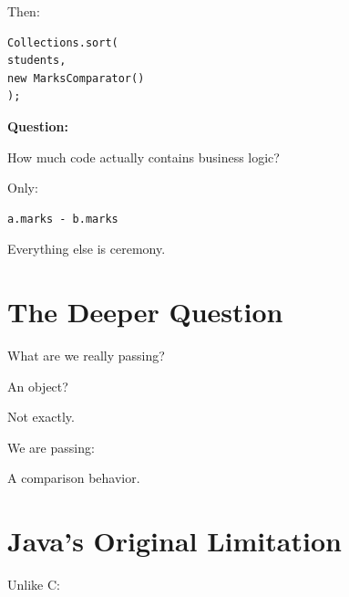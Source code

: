 \documentclass[11pt,a4paper]{book}
\begin{document}

Then:

\begin{verbatim} 
Collections.sort(
students,
new MarksComparator()
);
\end{verbatim}


\textbf{Question:}


How much code actually
contains business logic?


Only:

\begin{verbatim} 
a.marks - b.marks
\end{verbatim}


Everything else is ceremony.


\section{The Deeper Question}

What are we really passing?


An object?


Not exactly.


We are passing:


A comparison behavior.


\section{Java's Original Limitation}

Unlike C:
\end{document}
